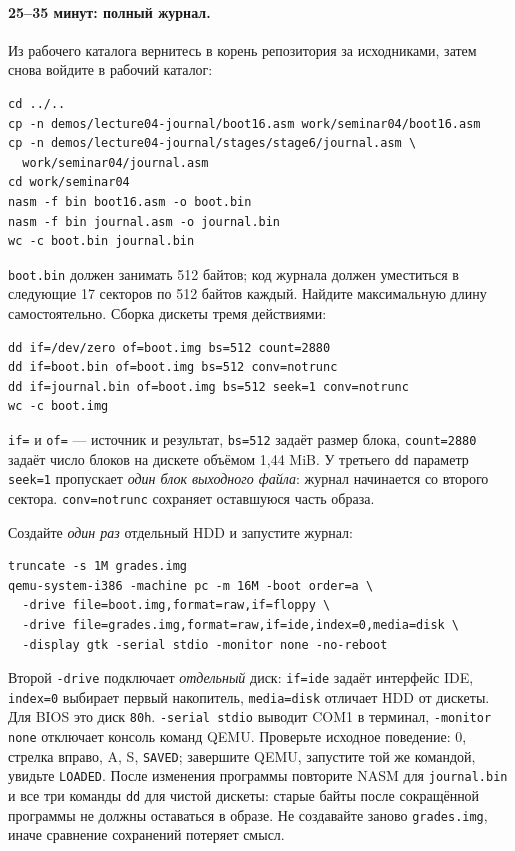 \paragraph{25--35 минут: полный журнал.}
Из рабочего каталога вернитесь в корень репозитория за исходниками,
затем снова войдите в рабочий каталог:
\begin{lstlisting}[basicstyle=\ttfamily\footnotesize]
cd ../..
cp -n demos/lecture04-journal/boot16.asm work/seminar04/boot16.asm
cp -n demos/lecture04-journal/stages/stage6/journal.asm \
  work/seminar04/journal.asm
cd work/seminar04
nasm -f bin boot16.asm -o boot.bin
nasm -f bin journal.asm -o journal.bin
wc -c boot.bin journal.bin
\end{lstlisting}
\texttt{boot.bin} должен занимать 512 байтов; код журнала должен
уместиться в следующие 17 секторов по 512 байтов каждый. Найдите
максимальную длину самостоятельно. Сборка дискеты тремя действиями:
\begin{lstlisting}[basicstyle=\ttfamily\footnotesize]
dd if=/dev/zero of=boot.img bs=512 count=2880
dd if=boot.bin of=boot.img bs=512 conv=notrunc
dd if=journal.bin of=boot.img bs=512 seek=1 conv=notrunc
wc -c boot.img
\end{lstlisting}
\texttt{if=} и \texttt{of=} --- источник и результат,
\texttt{bs=512} задаёт размер блока, \texttt{count=2880}
задаёт число блоков на дискете объёмом 1,44 MiB. У третьего
\texttt{dd} параметр \texttt{seek=1} пропускает \emph{один блок
выходного файла}: журнал начинается со второго сектора.
\texttt{conv=notrunc} сохраняет оставшуюся часть образа.

Создайте \emph{один раз} отдельный HDD и запустите журнал:
\begin{lstlisting}[basicstyle=\ttfamily\footnotesize]
truncate -s 1M grades.img
qemu-system-i386 -machine pc -m 16M -boot order=a \
  -drive file=boot.img,format=raw,if=floppy \
  -drive file=grades.img,format=raw,if=ide,index=0,media=disk \
  -display gtk -serial stdio -monitor none -no-reboot
\end{lstlisting}
Второй \texttt{-drive} подключает \emph{отдельный} диск:
\texttt{if=ide} задаёт интерфейс IDE, \texttt{index=0} выбирает
первый накопитель, \texttt{media=disk} отличает HDD от дискеты.
Для BIOS это диск \texttt{80h}. \texttt{-serial stdio} выводит COM1
в терминал, \texttt{-monitor none} отключает консоль команд QEMU.
Проверьте исходное поведение: 0, стрелка вправо, A, S,
\texttt{SAVED}; завершите QEMU, запустите той же командой,
увидьте \texttt{LOADED}. После изменения программы повторите NASM
для \texttt{journal.bin} и все три команды \texttt{dd} для чистой
дискеты: старые байты после сокращённой программы не должны оставаться
в образе. Не создавайте заново \texttt{grades.img}, иначе сравнение
сохранений потеряет смысл.

